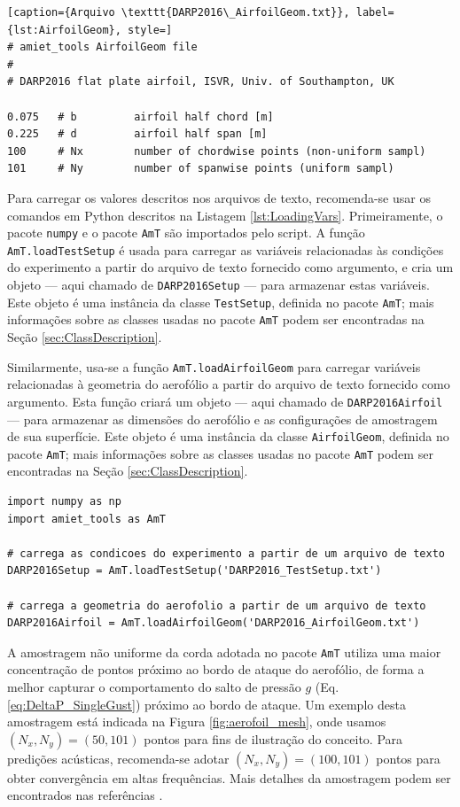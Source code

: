 \documentclass[a4paper, 11pt, twoside]{article}
\newcommand{\AmT}{\texttt{AmT}}
\begin{document}
\begin{lstlisting}[caption={Arquivo \texttt{DARP2016\_AirfoilGeom.txt}}, label={lst:AirfoilGeom}, style=]
# amiet_tools AirfoilGeom file
#
# DARP2016 flat plate airfoil, ISVR, Univ. of Southampton, UK

0.075	# b			airfoil half chord [m]
0.225	# d 		airfoil half span [m]
100		# Nx 		number of chordwise points (non-uniform sampl)
101		# Ny 		number of spanwise points (uniform sampl)
\end{lstlisting}

Para carregar os valores descritos nos arquivos de texto, recomenda-se usar os comandos em Python descritos na Listagem \ref{lst:LoadingVars}. Primeiramente, o pacote \verb|numpy| e o pacote \AmT{} são importados pelo script. A função \verb|AmT.loadTestSetup| é usada para carregar as variáveis relacionadas às condições do experimento a partir do arquivo de texto fornecido como argumento, e cria um objeto --- aqui chamado de \verb|DARP2016Setup| --- para armazenar estas variáveis. Este objeto é uma instância da classe \verb|TestSetup|, definida no pacote \AmT{}; mais informações sobre as classes usadas no pacote \AmT{} podem ser encontradas na Seção \ref{sec:ClassDescription}.

Similarmente, usa-se a função \verb|AmT.loadAirfoilGeom| para carregar variáveis relacionadas à geometria do aerofólio a partir do arquivo de texto fornecido como argumento. Esta função criará um objeto --- aqui chamado de \verb|DARP2016Airfoil| --- para armazenar as dimensões do aerofólio e as configurações de amostragem de sua superfície. Este objeto é uma instância da classe \verb|AirfoilGeom|, definida no pacote \AmT{}; mais informações sobre as classes usadas no pacote \AmT{} podem ser encontradas na Seção \ref{sec:ClassDescription}.

\begin{lstlisting}[caption={Método recomendado para importar pacotes e carregar variáveis},label={lst:LoadingVars}]
import numpy as np
import amiet_tools as AmT

# carrega as condicoes do experimento a partir de um arquivo de texto
DARP2016Setup = AmT.loadTestSetup('DARP2016_TestSetup.txt')

# carrega a geometria do aerofolio a partir de um arquivo de texto
DARP2016Airfoil = AmT.loadAirfoilGeom('DARP2016_AirfoilGeom.txt')
\end{lstlisting}

A amostragem não uniforme da corda adotada no pacote \AmT{} utiliza uma maior concentração de pontos próximo ao bordo de ataque do aerofólio, de forma a melhor capturar o comportamento do salto de pressão $g$ (Eq. \ref{eq:DeltaP_SingleGust}) próximo ao bordo de ataque. Um exemplo desta amostragem está indicada na Figura \ref{fig:aerofoil_mesh}, onde usamos $(N_x, N_y) = (50, 101)$ pontos para fins de ilustração do conceito. Para predições acústicas, recomenda-se adotar $(N_x, N_y) = (100, 101)$ pontos para obter convergência em altas frequências. Mais detalhes da amostragem podem ser encontrados nas referências \cite{Casagrande18, Casagrande_etal2020}.
\end{document}

